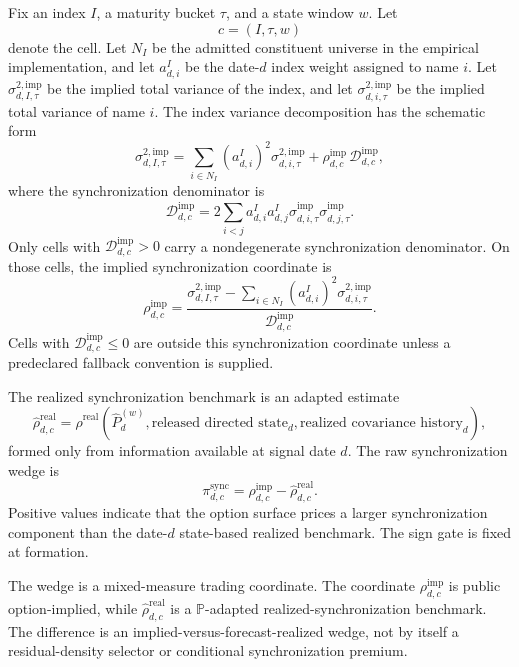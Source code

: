 \documentclass[11pt,a4paper]{amsart}
\theoremstyle{plain}
\theoremstyle{definition}
\theoremstyle{remark}
\newcommand{\PP}{\mathbb{P}}
\newcommand{\cD}{\mathcal{D}}
\begin{document}
Fix an index \(I\), a maturity bucket \(\tau\), and a state window \(w\).  Let
\[
        c=(I,\tau,w)
\]
denote the cell.  Let \(N_I\) be the admitted constituent universe in the empirical implementation,
and let \(a_{d,i}^{I}\) be the date-\(d\) index weight assigned to name \(i\).  Let
\(\sigma_{d,I,\tau}^{2,\mathrm{imp}}\) be the implied total variance of the index, and let
\(\sigma_{d,i,\tau}^{2,\mathrm{imp}}\) be the implied total variance of name \(i\).  The index
variance decomposition has the schematic form
\[
        \sigma_{d,I,\tau}^{2,\mathrm{imp}}
        =
        \sum_{i\in N_I}(a_{d,i}^{I})^2\sigma_{d,i,\tau}^{2,\mathrm{imp}}
        +
        \rho_{d,c}^{\mathrm{imp}}\,
        \cD_{d,c}^{\mathrm{imp}},
\]
where the synchronization denominator is
\[
        \cD_{d,c}^{\mathrm{imp}}
        =
        2\sum_{i<j}a_{d,i}^{I}a_{d,j}^{I}
        \sigma_{d,i,\tau}^{\mathrm{imp}}
        \sigma_{d,j,\tau}^{\mathrm{imp}}.
\]
Only cells with \(\cD_{d,c}^{\mathrm{imp}}>0\) carry a nondegenerate synchronization denominator.
On those cells, the implied synchronization coordinate is
\[
        \rho_{d,c}^{\mathrm{imp}}
        =
        \frac{
        \sigma_{d,I,\tau}^{2,\mathrm{imp}}
        -
        \sum_{i\in N_I}(a_{d,i}^{I})^2\sigma_{d,i,\tau}^{2,\mathrm{imp}}
        }{
        \cD_{d,c}^{\mathrm{imp}}
        }.
\]
Cells with \(\cD_{d,c}^{\mathrm{imp}}\le0\) are outside this synchronization coordinate unless a
predeclared fallback convention is supplied.

The realized synchronization benchmark is an adapted estimate
\[
        \widehat\rho_{d,c}^{\mathrm{real}}
        =
        \widehat\rho^{\mathrm{real}}(\widehat P_d^{(w)},\text{released directed state}_d,
        \text{realized covariance history}_d),
\]
formed only from information available at signal date \(d\).  The raw synchronization wedge is
\[
        \pi_{d,c}^{\mathrm{sync}}
        =
        \rho_{d,c}^{\mathrm{imp}}-\widehat\rho_{d,c}^{\mathrm{real}}.
\]
Positive values indicate that the option surface prices a larger synchronization component than
the date-\(d\) state-based realized benchmark.  The sign gate is fixed at formation.

The wedge is a mixed-measure trading coordinate.  The coordinate
\(\rho_{d,c}^{\mathrm{imp}}\) is public option-implied, while
\(\widehat\rho_{d,c}^{\mathrm{real}}\) is a \(\PP\)-adapted realized-synchronization benchmark.
The difference is an implied-versus-forecast-realized wedge, not by itself a residual-density
selector or conditional synchronization premium.
\end{document}
